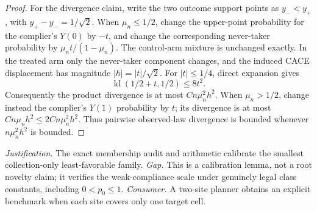 \documentclass{article}
\begin{document}
\begin{proof}
For the divergence claim, write the two outcome support points as \(y_-<y_+\), with \(y_+-y_-=1/\sqrt2\). When \(\mu_n\le1/2\), change the upper-point probability for the complier's \(Y(0)\) by \(-t\), and change the corresponding never-taker probability by \(\mu_nt/(1-\mu_n)\). The control-arm mixture is unchanged exactly. In the treated arm only the never-taker component changes, and the induced CACE displacement has magnitude \(|h|=|t|/\sqrt2\). For \(|t|\le1/4\), direct expansion gives
\[
 \operatorname{kl}(1/2+t,1/2)\le8t^2.
\]
Consequently the product divergence is at most \(Cn\mu_n^2h^2\). When \(\mu_n>1/2\), change instead the complier's \(Y(1)\) probability by \(t\); its divergence is at most \(Cn\mu_nh^2\le2Cn\mu_n^2h^2\). Thus pairwise observed-law divergence is bounded whenever \(n\mu_n^2h^2\) is bounded.
\end{proof}
\par\smallskip\noindent \textit{Justification.} The exact membership audit and arithmetic calibrate the smallest collection-only least-favorable family. \textit{Gap.} This is a calibration lemma, not a root novelty claim; it verifies the weak-compliance scale under genuinely legal class constants, including \(0<p_0\le1\). \textit{Consumer.} A two-site planner obtains an explicit benchmark when each site covers only one target cell.
\end{document}
